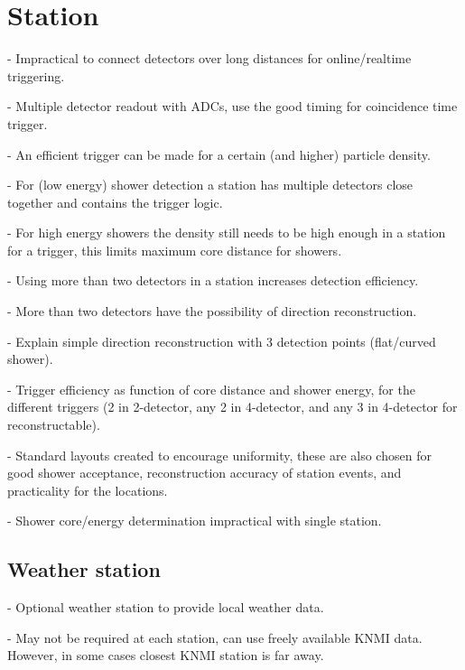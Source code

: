 \section{Station}


- Impractical to connect detectors over long distances for online/realtime triggering.

- Multiple detector readout with ADCs, use the good timing for coincidence time trigger.

- An efficient trigger can be made for a certain (and higher) particle density.

- For (low energy) shower detection a station has multiple detectors close together and contains the trigger logic.

- For high energy showers the density still needs to be high enough in a station for a trigger, this limits maximum core distance for showers.

- Using more than two detectors in a station increases detection efficiency.

- More than two detectors have the possibility of direction reconstruction.

- Explain simple direction reconstruction with 3 detection points (flat/curved shower).

- Trigger efficiency as function of core distance and shower energy, for the different triggers (2 in 2-detector, any 2 in 4-detector, and any 3 in 4-detector for reconstructable).

- Standard layouts created to encourage uniformity, these are also chosen for good shower acceptance, reconstruction accuracy of station events, and practicality for the locations.

- Shower core/energy determination impractical with single station.

\subsection{Weather station}


- Optional weather station to provide local weather data.

- May not be required at each station, can use freely available KNMI data. However, in some cases closest KNMI station is far away.


